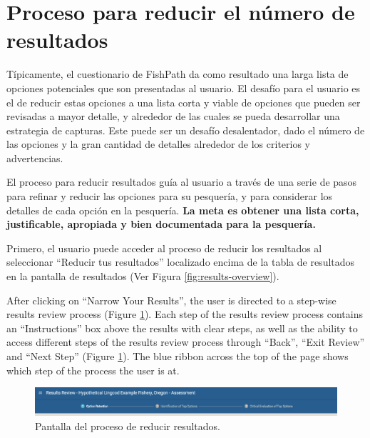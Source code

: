 \documentclass[
  11pt,
]{book}
\begin{document}
\hypertarget{Results-Narrowing}{%
\section{Proceso para reducir el número de resultados}\label{Results-Narrowing}}

Típicamente, el cuestionario de FishPath da como resultado una larga lista de opciones potenciales que son presentadas al usuario. El desafío para el usuario es el de reducir estas opciones a una lista corta y viable de opciones que pueden ser revisadas a mayor detalle, y alrededor de las cuales se pueda desarrollar una estrategia de capturas. Este puede ser un desafío desalentador, dado el número de las opciones y la gran cantidad de detalles alrededor de los criterios y advertencias.

El proceso para reducir resultados guía al usuario a través de una serie de pasos para refinar y reducir las opciones para su pesquería, y para considerar los detalles de cada opción en la pesquería. \textbf{La meta es obtener una lista corta, justificable, apropiada y bien documentada para la pesquería.}

Primero, el usuario puede acceder al proceso de reducir los resultados al seleccionar ``Reducir tus resultados'' localizado encima de la tabla de resultados en la pantalla de resultados (Ver Figura \ref{fig:results-overview}).

After clicking on ``Narrow Your Results'', the user is directed to a step-wise results review process (Figure \ref{fig:results-review-header}). Each step of the results review process contains an ``Instructions'' box above the results with clear steps, as well as the ability to access different steps of the results review process through ``Back'', ``Exit Review'' and ``Next Step'' (Figure \ref{fig:results-review-header}). The blue ribbon across the top of the page shows which step of the process the user is at.

\begin{figure}

{\centering \includegraphics[width=0.95\linewidth]{images/results-review-header} 

}

\caption{Pantalla del proceso de reducir resultados.}\label{fig:results-review-header}
\end{figure}
\end{document}
